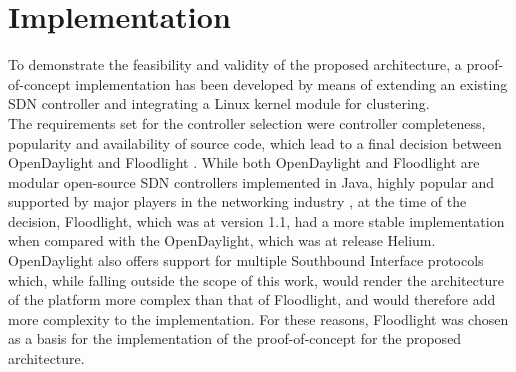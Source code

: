 
\chapter{Implementation}
\label{chapter:implementation}
To demonstrate the feasibility and validity of the proposed architecture, a proof-of-concept implementation has been developed by means of extending an existing \gls{SDN} controller and integrating a Linux kernel module for clustering.\\
%
The requirements set for the controller selection were controller completeness, popularity and availability of source code, which lead to a final decision between OpenDaylight \cite{OpenDaylight} and Floodlight \cite{Floodlight}\cite{Kreutz2014}\cite{ControllerComparison}.
While both OpenDaylight and Floodlight are modular open-source \gls{SDN} controllers implemented in Java, highly popular and supported by major players in the networking industry \cite{OpenDaylight}\cite{Floodlight}, at the time of the decision, Floodlight, which was at version 1.1, had a more stable implementation when compared with the OpenDaylight, which was at release Helium.
OpenDaylight also offers support for multiple Southbound Interface protocols which, while falling outside the scope of this work, would render the architecture of the platform more complex than that of Floodlight, and would therefore add more complexity to the implementation.
For these reasons, Floodlight was chosen as a basis for the implementation of the proof-of-concept for the proposed architecture.\\
%
